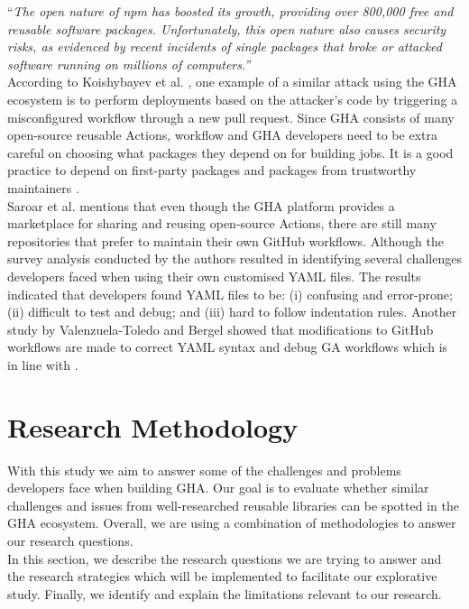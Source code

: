 \documentclass[conference]{IEEEtran}
\begin{document}
“\textit{The open nature of npm has boosted its growth, providing over 800,000 free and reusable software packages. Unfortunately, this open nature also causes security risks, as evidenced by recent incidents of single packages that broke or attacked software running on millions of computers.”} \\

According to Koishybayev et al. \cite{koishybayev2022characterizing}, one example of a similar attack using the GHA ecosystem is to perform deployments based on the attacker’s code by triggering a misconfigured workflow through a new pull request. Since GHA consists of many open-source reusable Actions, workflow and GHA developers need to be extra careful on choosing what packages they depend on for building jobs. It is a good practice to depend on first-party packages and packages from trustworthy maintainers \cite{zimmermann2019small}. \\

Saroar et al. \cite{saroar2023developers} mentions that even though the GHA platform provides a marketplace for sharing and reusing open-source Actions, there are still many repositories that prefer to maintain their own GitHub workflows. Although the survey analysis conducted by the authors resulted in identifying several challenges developers faced when using their own customised YAML files.  The results indicated that developers found YAML files to be: (i) confusing and error-prone; (ii) difficult to test and debug; and (iii) hard to follow indentation rules. Another study by Valenzuela-Toledo and Bergel \cite{valenzuela2022evolution}  showed that modifications to GitHub workflows are made to correct YAML syntax and debug GA workflows which is in line with \cite{saroar2023developers}.


\section{Research Methodology}
With this study we aim to answer some of the challenges and problems developers face when building GHA. Our goal is to evaluate whether similar challenges and issues from well-researched reusable libraries can be spotted in the GHA ecosystem. Overall,  we are using a combination of methodologies to answer our research questions.\\

In this section, we describe the research questions we are trying to answer and the research strategies which will be implemented to facilitate our explorative study. Finally, we identify and explain the limitations relevant to our research.
\end{document}
